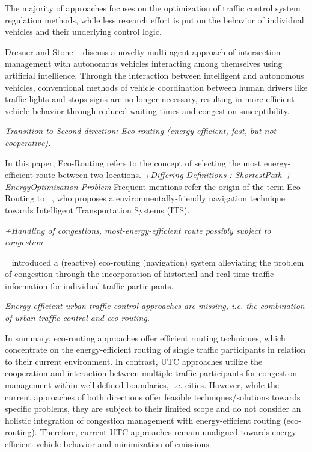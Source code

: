 \documentclass[conference]{../cls/IEEEtran}
\begin{document}
The majority of approaches focuses on the optimization of traffic control
system regulation methods, while less research effort is put
on the behavior of individual vehicles and their underlying control logic. 

Dresner and Stone ~\cite{Dresner2008} discuss a novelty multi-agent approach of
intersection management with autonomous vehicles interacting among themselves using artificial
intellience. Through the interaction between intelligent and autonomous
vehicles, conventional methods of vehicle coordination between human drivers like traffic lights and 
stops signs are no longer necessary, resulting in more efficient
vehicle behavior through reduced waiting times and congestion susceptibility.


\textit{Transition to Second direction: Eco-routing (energy efficient, fast, but
not cooperative).}

In this paper, Eco-Routing refers to the concept of selecting the most
energy-efficient route between two locations.
\textit{+Differing Definitions : ShortestPath + EnergyOptimization Problem}
Frequent mentions refer the origin of the term Eco-Routing to
~\cite{Barth2007}, who proposes a environmentally-friendly
navigation technique towards Intelligent Transportation Systems (ITS).

\textit{+Handling of congestions, most-energy-efficient route possibly
subject to congestion}

 ~\cite{Boriboonsomsin2012} introduced a (reactive) eco-routing (navigation)
 system alleviating the problem of congestion through the
 incorporation of historical and real-time traffic information for individual
 traffic participants.


\textit{Energy-efficient urban traffic control approaches are
missing, i.e.
the combination of urban traffic control and eco-routing.}

In summary, eco-routing approaches offer efficient routing techniques, which
concentrate on the energy-efficient routing of single traffic participants in
relation to their current environment.  In contrast, UTC approaches utilize the
cooperation and interaction between multiple traffic participants for congestion
management within well-defined boundaries, i.e.
cities. 
However, while the current approaches of both
directions offer feasible techniques/solutions towards specific problems, they are
subject to their limited scope and do not consider an holistic integration of
congestion management with energy-efficient routing (eco-routing). Therefore,
current UTC approaches remain unaligned towards energy-efficient vehicle
behavior and minimization of emissions.
\end{document}
